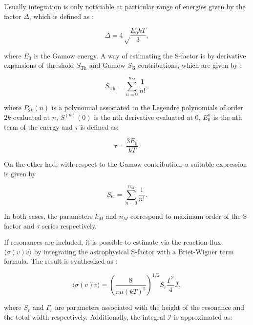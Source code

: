 \documentclass[openany]{book}
\begin{document}
Usually integration is only noticiable at particular range of energies given by the factor $\Delta$, which is defined as \cite{ueda_sargeant_pato_hussein_2002}: 


\begin{equation}\label{eq:sfactor_delta}
	\Delta = 4 \sqrt \frac{E_0 kT}{3},
\end{equation}

where $E_0$ is the Gamow energy. A way of estimating the S-factor is by derivative expansions of threshold $S_{\mathrm{Th}}$ and Gamow $S_{\mathrm{G}}$ contributions, which are given by \cite{ueda_sargeant_pato_hussein_2002}: 

\begin{equation}\label{eq:sfactor_nonResonant_threshold}
	S_{\mathrm{Th}} =  \sum_{n = 0} ^{n_M} {\frac{1}{n!}}, 
\end{equation}

where $P_{2k}(n)$ is a polynomial associated to the Legendre polynomials of order $2k$ evaluated at $n$, $S^{(n)}(0)$ is the nth derivative evaluated at 0, $E^n_0$ is the nth term of the energy and $\tau$ is defined as: 

\begin{equation}\label{eq:sfactor_nonResonant_tau}
	\tau = \frac{3E_0}{kT}.
\end{equation}

On the other had, with respect to the Gamow contribution, a suitable expression is given by 

\begin{equation}\label{eq:sfactor_nonResonant_Gamow}
	S_{\mathrm{G}}  = \sum_{n = 0} ^{n_M} {\frac{1}{n!}}.
\end{equation}

In both cases, the parameters $k_M$ and $n_M$ correspond to maximum order of the S-factor and $\tau$ series respectively.


If resonances are included, it is possible to estimate via the reaction flux $\langle \sigma (v) v \rangle$ by integrating the astrophysical S-factor with a Briet-Wigner term formula. The result is synthesized as \cite{ueda_sargeant_pato_hussein_2004}: 

 \begin{equation}\label{eq:sfactor_rate_resonant}
 	\langle \sigma (v) v \rangle= \left ( \frac{8}{\pi \mu (kT)^5} \right)^{1/2} S_r \frac{\Gamma^2}{4} \mathcal{I},
 \end{equation}

where $S_r$ and $\Gamma_r$ are parameters associated with the height of the resonance and the total width respectively. Additionally, the integral $\mathcal{I}$ is approximated as: 
\end{document}
